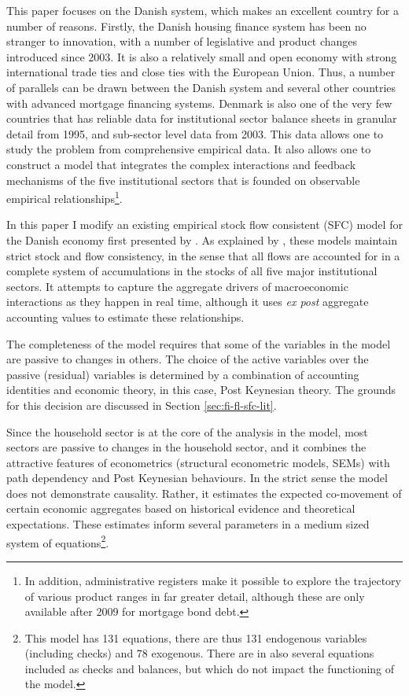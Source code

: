 \documentclass[
]{book}
\begin{document}
This paper focuses on the Danish system, which makes an excellent country for a number of reasons. Firstly, the Danish housing finance system has been no stranger to innovation, with a number of legislative and product changes introduced since 2003. It is also a relatively small and open economy with strong international trade ties and close ties with the European Union. Thus, a number of parallels can be drawn between the Danish system and several other countries with advanced mortgage financing systems. Denmark is also one of the very few countries that has reliable data for institutional sector balance sheets in granular detail from 1995, and sub-sector level data from 2003. This data allows one to study the problem from comprehensive empirical data. It also allows one to construct a model that integrates the complex interactions and feedback mechanisms of the five institutional sectors that is founded on observable empirical relationships\footnote{In addition, administrative registers make it possible to explore the trajectory of various product ranges in far greater detail, although these are only available after 2009 for mortgage bond debt.}.

In this paper I modify an existing empirical stock flow consistent (SFC) model for the Danish economy first presented by \citet{byrialsenraza2019empirical}. As explained by \citet{godleylavoie2012}, these models maintain strict stock and flow consistency, in the sense that all flows are accounted for in a complete system of accumulations in the stocks of all five major institutional sectors. It attempts to capture the aggregate drivers of macroeconomic interactions as they happen in real time, although it uses \emph{ex post} aggregate accounting values to estimate these relationships.

The completeness of the model requires that some of the variables in the model are passive to changes in others. The choice of the active variables over the passive (residual) variables is determined by a combination of accounting identities and economic theory, in this case, Post Keynesian theory. The grounds for this decision are discussed in Section \ref{sec:fi-fl-sfc-lit}.

Since the household sector is at the core of the analysis in the model, most sectors are passive to changes in the household sector, and it combines the attractive features of econometrics (structural econometric models, SEMs) with path dependency and Post Keynesian behaviours. In the strict sense the model does not demonstrate causality. Rather, it estimates the expected co-movement of certain economic aggregates based on historical evidence and theoretical expectations. These estimates inform several parameters in a medium sized system of equations\footnote{This model has 131 equations, there are thus 131 endogenous variables (including checks) and 78 exogenous. There are in also several equations included as checks and balances, but which do not impact the functioning of the model.}.
\end{document}
